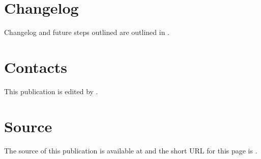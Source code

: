 \documentclass[letterpaper,10pt,english]{sphinxmanual}
\begin{document}
\section{Changelog}
\label{\detokenize{index:changelog}}
Changelog and future steps outlined are outlined in .


\section{Contacts}
\label{\detokenize{index:contacts}}
This publication is edited by .


\section{Source}
\label{\detokenize{index:source}}
The source of this publication is available at 
and the short URL for this page is .



\renewcommand{\indexname}{Index}
\printindex
\end{document}
